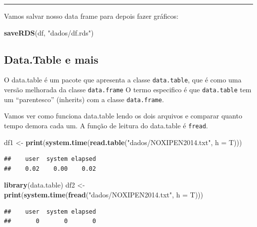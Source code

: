\documentclass[]{book}
\newenvironment{Shaded}{\begin{snugshade}}{\end{snugshade}}
\newcommand{\KeywordTok}[1]{\textcolor[rgb]{0.13,0.29,0.53}{\textbf{#1}}}
\newcommand{\DataTypeTok}[1]{\textcolor[rgb]{0.13,0.29,0.53}{#1}}
\newcommand{\StringTok}[1]{\textcolor[rgb]{0.31,0.60,0.02}{#1}}
\newcommand{\NormalTok}[1]{#1}
\theoremstyle{definition}
\theoremstyle{definition}
\theoremstyle{definition}
\theoremstyle{remark}
\begin{document}
\begin{center}\rule{0.5\linewidth}{\linethickness}\end{center}

Vamos salvar nosso data frame para depois fazer gráficos:

\begin{Shaded}
\begin{Highlighting}[]
\KeywordTok{saveRDS}\NormalTok{(df, }\StringTok{"dados/df.rds"}\NormalTok{)}
\end{Highlighting}
\end{Shaded}

\subsection{Data.Table e mais}\label{data.table-e-mais}

O data.table é um pacote que apresenta a classe \texttt{data.table}, que
é como uma versão melhorada da classe \texttt{data.frame} O termo
especifico é que \texttt{data.table} tem um ``parentesco'' (inherits)
com a classe \texttt{data.frame}.

Vamos ver como funciona data.table lendo os dois arquivos e comparar
quanto tempo demora cada um. A função de leitura do data.table é
\texttt{fread}.

\begin{Shaded}
\begin{Highlighting}[]
\NormalTok{df1 <-}\StringTok{ }\KeywordTok{print}\NormalTok{(}\KeywordTok{system.time}\NormalTok{(}\KeywordTok{read.table}\NormalTok{(}\StringTok{"dados/NOXIPEN2014.txt"}\NormalTok{, }\DataTypeTok{h =}\NormalTok{ T)))}
\end{Highlighting}
\end{Shaded}

\begin{verbatim}
##    user  system elapsed 
##    0.02    0.00    0.02
\end{verbatim}

\begin{Shaded}
\begin{Highlighting}[]
\KeywordTok{library}\NormalTok{(data.table)}
\NormalTok{df2 <-}\StringTok{ }\KeywordTok{print}\NormalTok{(}\KeywordTok{system.time}\NormalTok{(}\KeywordTok{fread}\NormalTok{(}\StringTok{"dados/NOXIPEN2014.txt"}\NormalTok{, }\DataTypeTok{h =}\NormalTok{ T)))}
\end{Highlighting}
\end{Shaded}

\begin{verbatim}
##    user  system elapsed 
##       0       0       0
\end{verbatim}
\end{document}
